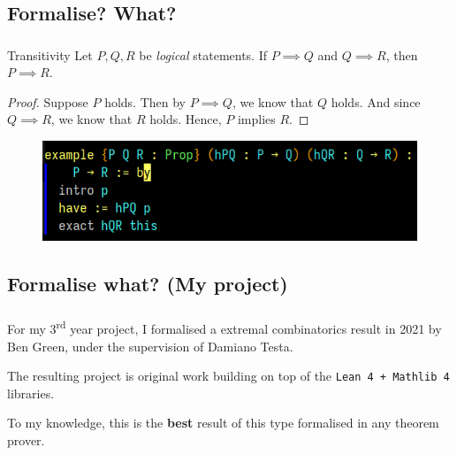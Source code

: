 \subsection{Formalise? What? }
\begin{frame}\frametitle{\insertsubsection}

\begin{block}{Transitivity}
  Let \(P, Q, R\) be \textit{logical} statements. If \(P \implies Q\) and \(Q \implies R\), then \(P \implies R\).
\end{block}

\begin{proof}
  Suppose \(P\) holds. Then by \(P \implies Q\), we know that \(Q\) holds. And since \(Q \implies R\), we know that \(R\) holds. Hence, \(P\) implies \(R\).
\end{proof}

\begin{figure}
  \centering
  \includegraphics[scale=0.6]{images/demo.png}
\end{figure}

\end{frame}



%
%



\subsection{Formalise what? (My project)}
\begin{frame}\frametitle{\insertsubsection}

For my 3\textsuperscript{rd} year project, I formalised a extremal combinatorics result in 2021 by Ben Green, under the supervision of Damiano Testa.

The resulting project is original work building on top of the \texttt{Lean 4 + Mathlib 4} libraries.

To my knowledge, this is the \textbf{best} result of this type formalised in any theorem prover.

\end{frame}

